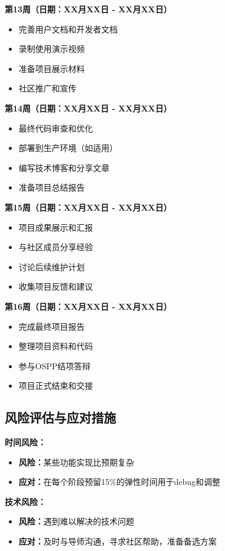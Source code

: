 \documentclass[a4paper,12pt]{article}
\begin{document}
\textbf{第13周（日期：XX月XX日 - XX月XX日）}
\begin{itemize}
    \item 完善用户文档和开发者文档
    \item 录制使用演示视频
    \item 准备项目展示材料
    \item 社区推广和宣传
\end{itemize}

\textbf{第14周（日期：XX月XX日 - XX月XX日）}
\begin{itemize}
    \item 最终代码审查和优化
    \item 部署到生产环境（如适用）
    \item 编写技术博客和分享文章
    \item 准备项目总结报告
\end{itemize}

\textbf{第15周（日期：XX月XX日 - XX月XX日）}
\begin{itemize}
    \item 项目成果展示和汇报
    \item 与社区成员分享经验
    \item 讨论后续维护计划
    \item 收集项目反馈和建议
\end{itemize}

\textbf{第16周（日期：XX月XX日 - XX月XX日）}
\begin{itemize}
    \item 完成最终项目报告
    \item 整理项目资料和代码
    \item 参与OSPP结项答辩
    \item 项目正式结束和交接
\end{itemize}

\subsection{风险评估与应对措施}

\textbf{时间风险：}
\begin{itemize}
    \item \textbf{风险：}某些功能实现比预期复杂
    \item \textbf{应对：}在每个阶段预留15\%的弹性时间用于debug和调整
\end{itemize}

\textbf{技术风险：}
\begin{itemize}
    \item \textbf{风险：}遇到难以解决的技术问题
    \item \textbf{应对：}及时与导师沟通，寻求社区帮助，准备备选方案
\end{itemize}
\end{document}
